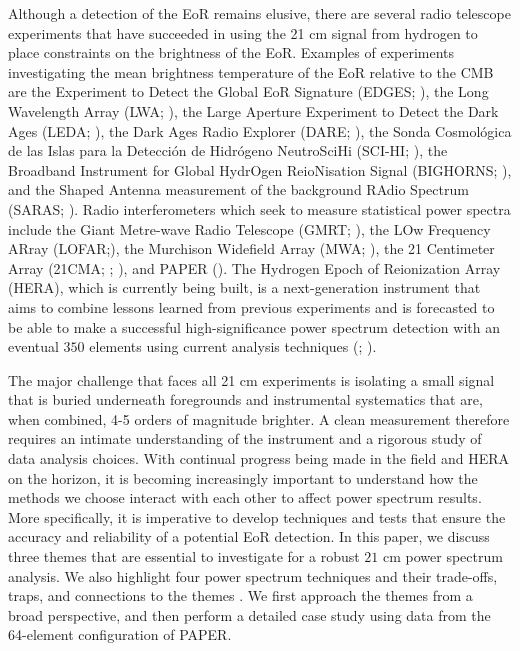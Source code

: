 \documentclass[preprint2,numberedappendix,tighten]{aastex6}  %
\begin{document}
Although a detection of the EoR remains elusive, there are several radio telescope experiments that have succeeded in using the 21 cm signal from hydrogen to place constraints on the brightness of the EoR. Examples of experiments investigating the mean brightness temperature of the EoR relative to the CMB are the Experiment to Detect the Global EoR Signature (EDGES; \citealt{bowman2010}), the Long Wavelength Array (LWA; \citealt{ellingson_et_al2009}),  the Large Aperture Experiment to Detect the Dark Ages (LEDA; \citealt{greenhill_bernardi2012}), the Dark Ages Radio Explorer (DARE; \citealt{burns2012}), the Sonda Cosmol\'ogica de las Islas para la Detecci\'on de Hidr\'ogeno NeutroSciHi (SCI-HI; \citealt{voytek2014}), the Broadband Instrument for Global HydrOgen ReioNisation Signal (BIGHORNS; \citealt{sokolowski2015}), and the Shaped Antenna measurement of the background RAdio Spectrum (SARAS; \citealt{patra2015}). Radio interferometers which seek to measure statistical power spectra include the Giant Metre-wave Radio Telescope (GMRT; \citealt{paciga_et_al2013}), the LOw Frequency ARray (LOFAR;\citealt{van_haarlem_et_al2013}), the Murchison Widefield Array (MWA; \citealt{tingay_et_al2013}), the 21 Centimeter Array (21CMA; \citealt{peterson_et_al2004}; \citealt{wu2009}), and PAPER (\citealt{parsons_et_al2010}). The Hydrogen Epoch of Reionization Array (HERA), which is currently being built, is a next-generation instrument that aims to combine lessons learned from previous experiments and is forecasted to be able to make a successful high-significance power spectrum detection with an eventual $350$ elements using current analysis techniques (\citealt{deboer_et_al2017}; \citealt{pober_et_al2014}).

The major challenge that faces all 21 cm experiments is isolating a small signal that is buried underneath foregrounds and instrumental systematics that are, when combined, 4-5 orders of magnitude brighter. A clean measurement therefore requires an intimate understanding of the instrument and a rigorous study of data analysis choices. With continual progress being made in the field and HERA on the horizon, it is becoming increasingly important to understand how the methods we choose interact with each other to affect power spectrum results. More specifically, it is imperative to develop techniques and tests that ensure the accuracy and reliability of a potential EoR detection. In this paper, we discuss three themes that are essential to investigate for a robust $21$ cm power spectrum analysis. We also highlight four power spectrum techniques and their trade-offs, traps, and connections to the themes . We first approach the themes from a broad perspective, and then perform a detailed case study using data from the 64-element configuration of PAPER.
\end{document}
